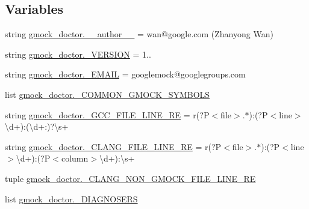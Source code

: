 \subsection*{Variables}
\begin{DoxyCompactItemize}
\item 
string \mbox{\hyperlink{namespacegmock__doctor_a5834be312e84670506af7df4a7b6bf51}{gmock\+\_\+doctor.\+\_\+\+\_\+author\+\_\+\+\_\+}} = \textquotesingle{}wan@google.\+com (Zhanyong Wan)\textquotesingle{}
\item 
string \mbox{\hyperlink{namespacegmock__doctor_a8f29d54c7339c9ac86409b5e78f63887}{gmock\+\_\+doctor.\+\_\+\+V\+E\+R\+S\+I\+ON}} = \textquotesingle{}1..\textquotesingle{}
\item 
string \mbox{\hyperlink{namespacegmock__doctor_af8532f014caa9251e48f07e08d92f855}{gmock\+\_\+doctor.\+\_\+\+E\+M\+A\+IL}} = \textquotesingle{}googlemock@googlegroups.\+com\textquotesingle{}
\item 
list \mbox{\hyperlink{namespacegmock__doctor_ac704a49399e603fba5104e490f17fce3}{gmock\+\_\+doctor.\+\_\+\+C\+O\+M\+M\+O\+N\+\_\+\+G\+M\+O\+C\+K\+\_\+\+S\+Y\+M\+B\+O\+LS}}
\item 
string \mbox{\hyperlink{namespacegmock__doctor_abfa92b554c13bc7b3f37bd53a52288b4}{gmock\+\_\+doctor.\+\_\+\+G\+C\+C\+\_\+\+F\+I\+L\+E\+\_\+\+L\+I\+N\+E\+\_\+\+RE}} = r\textquotesingle{}(?P$<$file$>$.$\ast$)\+:(?P$<$line$>$\textbackslash{}d+)\+:(\textbackslash{}d+\+:)?\textbackslash{}s+\textquotesingle{}
\item 
string \mbox{\hyperlink{namespacegmock__doctor_a068279bf4a0afdf3f2106351892a8c42}{gmock\+\_\+doctor.\+\_\+\+C\+L\+A\+N\+G\+\_\+\+F\+I\+L\+E\+\_\+\+L\+I\+N\+E\+\_\+\+RE}} = r\textquotesingle{}(?P$<$file$>$.$\ast$)\+:(?P$<$line$>$\textbackslash{}d+)\+:(?P$<$column$>$\textbackslash{}d+)\+:\textbackslash{}s+\textquotesingle{}
\item 
tuple \mbox{\hyperlink{namespacegmock__doctor_a54b24983d4a31b34337e0ef6fdf4fe91}{gmock\+\_\+doctor.\+\_\+\+C\+L\+A\+N\+G\+\_\+\+N\+O\+N\+\_\+\+G\+M\+O\+C\+K\+\_\+\+F\+I\+L\+E\+\_\+\+L\+I\+N\+E\+\_\+\+RE}}
\item 
list \mbox{\hyperlink{namespacegmock__doctor_ad8d4f979dbf1b3c8edb226d124571b4e}{gmock\+\_\+doctor.\+\_\+\+D\+I\+A\+G\+N\+O\+S\+E\+RS}}
\end{DoxyCompactItemize}
